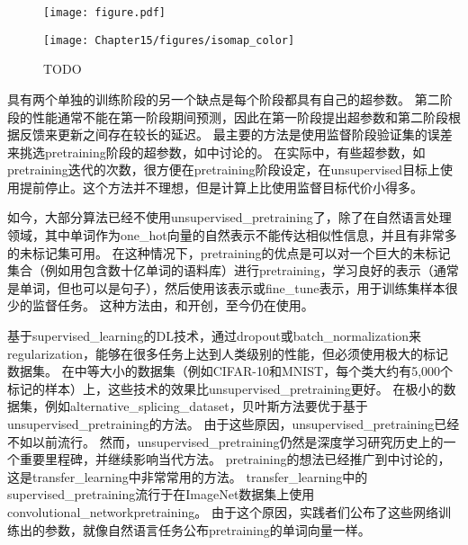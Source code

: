 
\begin{figure}[!htb]
\ifOpenSource
\centerline{\texttt{[image: figure.pdf]}}
\else
\centerline{\texttt{[image: Chapter15/figures/isomap\_color]}}
\fi
\caption{TODO}
\label{fig:chap15_isomap}
\end{figure}


具有两个单独的训练阶段的另一个缺点是每个阶段都具有自己的超参数。
第二阶段的性能通常不能在第一阶段期间预测，因此在第一阶段提出超参数和第二阶段根据反馈来更新之间存在较长的延迟。
最主要的方法是使用监督阶段验证集的误差来挑选\gls{pretraining}阶段的超参数，如\cite{Larochelle-jmlr-2009}中讨论的。
在实际中，有些超参数，如\gls{pretraining}迭代的次数，很方便在\gls{pretraining}阶段设定，在\gls{unsupervised}目标上使用提前停止。这个方法并不理想，但是计算上比使用监督目标代价小得多。


如今，大部分算法已经不使用\gls{unsupervised_pretraining}了，除了在自然语言处理领域，其中单词作为\gls{one_hot}向量的自然表示不能传达相似性信息，并且有非常多的未标记集可用。
在这种情况下，\gls{pretraining}的优点是可以对一个巨大的未标记集合（例如用包含数十亿单词的语料库）进行\gls{pretraining}，学习良好的表示（通常是单词，但也可以是句子），然后使用该表示或\gls{fine_tune}表示，用于训练集样本很少的监督任务。
这种方法由\cite{CollobertR2008-small}，\cite{Turian+Ratinov+Bengio-2010-small}和\cite{collobert2011natural}开创，至今仍在使用。


基于\gls{supervised_learning}的\gls{DL}技术，通过\gls{dropout}或\gls{batch_normalization}来\gls{regularization}，能够在很多任务上达到人类级别的性能，但必须使用极大的标记数据集。
在中等大小的数据集（例如CIFAR-10和MNIST，每个类大约有5,000个标记的样本）上，这些技术的效果比\gls{unsupervised_pretraining}更好。
在极小的数据集，例如\gls{alternative_splicing_dataset}，贝叶斯方法要优于基于\gls{unsupervised_pretraining}的方法\citep{Srivastava-master-small}。
由于这些原因，\gls{unsupervised_pretraining}已经不如以前流行。
然而，\gls{unsupervised_pretraining}仍然是深度学习研究历史上的一个重要里程碑，并继续影响当代方法。
\gls{pretraining}的想法已经推广到中讨论的，这是\gls{transfer_learning}中非常常用的方法。
\gls{transfer_learning}中的\gls{supervised_pretraining}流行\citep{Oquab-et-al-CVPR2014,yosinski-nips2014}于在ImageNet数据集上使用\gls{convolutional_network}\gls{pretraining}。
由于这个原因，实践者们公布了这些网络训练出的参数，就像自然语言任务公布\gls{pretraining}的单词向量一样\citep{collobert2011natural,Mikolov-et-al-ICLR2013}。

